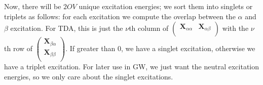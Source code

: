 Now, there will be $2OV$ unique excitation energies; we sort them into singlets or triplets as follows: for each excitation we compute the overlap between the $\alpha $ and $\beta $ excitation. For TDA, this is just the $\nu$th column of $\begin{pmatrix}
\mathbf{X}_{\alpha\alpha} & \mathbf{X}_{\alpha\beta}\\
\end{pmatrix}$ with the $\nu$th row of $\begin{pmatrix}
    \mathbf{X}_{\beta\alpha} \\ \mathbf{X}_{\beta\beta}\\
\end{pmatrix}$. If greater than 0, we have a singlet excitation, otherwise we have a triplet excitation. For later use in GW, we just want the neutral excitation energies, so we only care about the singlet excitations.

